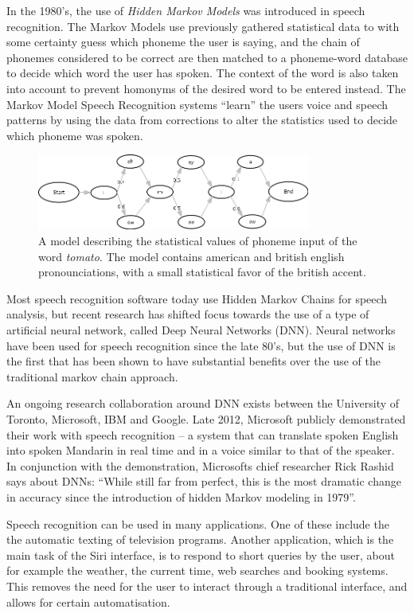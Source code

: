 In the 1980's, the use of \emph{Hidden Markov Models} was introduced in speech recognition\cite{rabiner1986introduction}. The Markov Models use previously gathered statistical data to with some certainty guess which phoneme the user is saying, and the chain of phonemes considered to be correct are then matched to a phoneme-word database to decide which word the user has spoken. The context of the word is also taken into account to prevent homonyms of the desired word to be entered instead. The Markov Model Speech Recognition systems ``learn'' the users voice and speech patterns by using the data from corrections to alter the statistics used to decide which phoneme was spoken.

\begin{figure}[]
\includegraphics[width=0.8\textwidth] {bilder/tomato.jpg}
\caption{A model describing the statistical values of phoneme input of the word \emph{tomato}. The model contains american and british english pronounciations, with a small statistical favor of the british accent.}
\label{ibooks}
\end{figure}

Most speech recognition software today use Hidden Markov Chains for speech analysis\cite{DNN}, but recent research has shifted focus towards the use of a type of artificial neural network, called Deep Neural Networks (DNN). Neural networks have been used for speech recognition since the late 80's\cite{waibel:phoneme}, but the use of DNN is the first that has been shown to have substantial benefits over the use of the traditional markov chain approach.

An ongoing research collaboration around DNN exists between the University of Toronto, Microsoft, IBM and Google. Late 2012, Microsoft publicly demonstrated their work with speech recognition -- a system that can translate spoken English into spoken Mandarin in real time and in a voice similar to that of the speaker. In conjunction with the demonstration, Microsofts chief researcher Rick Rashid says about DNNs: ``While still far from perfect, this is the most dramatic change in accuracy since the introduction of hidden Markov modeling in 1979''\cite{chin}.

Speech recognition can be used in many applications. One of these include the the automatic texting of television programs. Another application, which is the main task of the Siri interface, is to respond to short queries by the user, about for example the weather, the current time, web searches and booking systems. This removes the need for the user to interact through a traditional interface, and allows for certain automatisation.